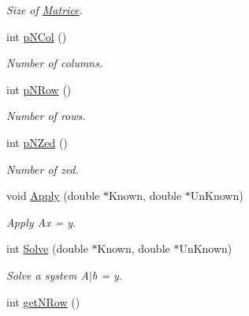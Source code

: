 \begin{DoxyCompactItemize}
\begin{DoxyCompactList}\small\item\em \-Size of \hyperlink{classMatrice}{\-Matrice}. \end{DoxyCompactList}\item 
\hypertarget{classMatrice_a8ff9da924c6e0d9cd89d650869b33c39}{int \hyperlink{classMatrice_a8ff9da924c6e0d9cd89d650869b33c39}{p\-N\-Col} ()}\label{classMatrice_a8ff9da924c6e0d9cd89d650869b33c39}

\begin{DoxyCompactList}\small\item\em \-Number of columns. \end{DoxyCompactList}\item 
\hypertarget{classMatrice_afd2c17a1b2a30f474d509fb9353e2f86}{int \hyperlink{classMatrice_afd2c17a1b2a30f474d509fb9353e2f86}{p\-N\-Row} ()}\label{classMatrice_afd2c17a1b2a30f474d509fb9353e2f86}

\begin{DoxyCompactList}\small\item\em \-Number of rows. \end{DoxyCompactList}\item 
\hypertarget{classMatrice_a201f7fc580e93bfd6b92301be8c82d40}{int \hyperlink{classMatrice_a201f7fc580e93bfd6b92301be8c82d40}{p\-N\-Zed} ()}\label{classMatrice_a201f7fc580e93bfd6b92301be8c82d40}

\begin{DoxyCompactList}\small\item\em \-Number of zed. \end{DoxyCompactList}\item 
\hypertarget{classMatrice_a3a63b6cadfd2cd5c3010892ca1a78d6d}{void \hyperlink{classMatrice_a3a63b6cadfd2cd5c3010892ca1a78d6d}{\-Apply} (double $\ast$\-Known, double $\ast$\-Un\-Known)}\label{classMatrice_a3a63b6cadfd2cd5c3010892ca1a78d6d}

\begin{DoxyCompactList}\small\item\em \-Apply \-Ax = y. \end{DoxyCompactList}\item 
\hypertarget{classMatrice_a660450c11d8e8ec196d63da73323a7cd}{int \hyperlink{classMatrice_a660450c11d8e8ec196d63da73323a7cd}{\-Solve} (double $\ast$\-Known, double $\ast$\-Un\-Known)}\label{classMatrice_a660450c11d8e8ec196d63da73323a7cd}

\begin{DoxyCompactList}\small\item\em \-Solve a system \-A$|$b = y. \end{DoxyCompactList}\item 
\hypertarget{classMatrice_a239681f05803501801eb5eb6db082453}{int \hyperlink{classMatrice_a239681f05803501801eb5eb6db082453}{get\-N\-Row} ()}\label{classMatrice_a239681f05803501801eb5eb6db082453}


\end{DoxyCompactItemize}
